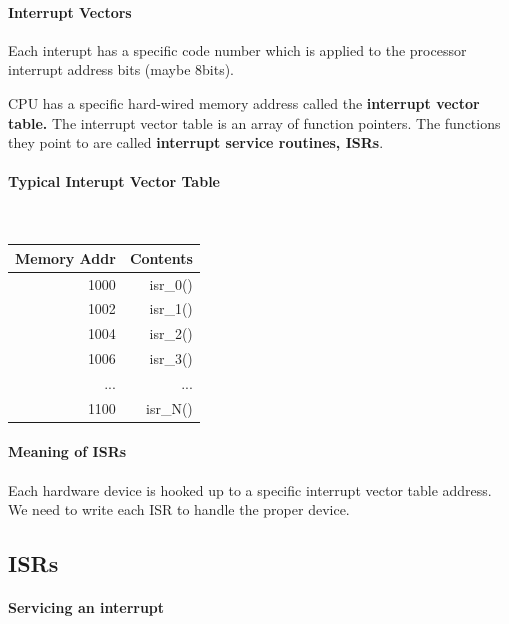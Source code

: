 \paragraph{Interrupt Vectors}

Each interupt has a specific code number which is applied to
the processor interrupt address bits (maybe 8bits).

CPU has a specific hard-wired memory address called the
{\bf interrupt vector table.}    The interrupt vector
table is an array of function pointers.  The functions
they point to are called
{\bf interrupt service routines, ISRs}.

\paragraph{Typical Interupt Vector Table}
{\tt
\begin{tabular}{|r|r|}
\hline
Memory Addr             &       Contents \\ \hline

1000                    &       isr\_0()  \\ \hline
1002                    &       isr\_1()  \\ \hline
1004                    &       isr\_2()  \\ \hline
1006                    &       isr\_3()  \\ \hline
...                     &       ...       \\ \hline
1100                    &       isr\_N()  \\ \hline

\end{tabular}
}

\paragraph{Meaning of ISRs}

Each hardware device is hooked up to a specific interrupt vector
table address.  We need to write each ISR to handle the proper
device.

\subsection{ISRs}

\paragraph{Servicing an interrupt}

